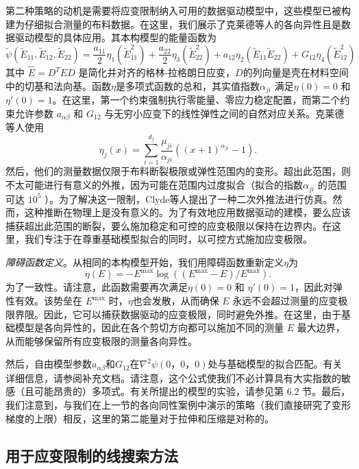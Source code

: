 第二种策略的动机是需要将应变限制纳入可用的数据驱动模型中，这些模型已被构建为仔细拟合测量的布料数据。在这里，我们展示了克莱德等人的各向异性且是数据驱动模型的具体应用。其本构模型的能量函数为
\begin{equation}
  \tilde\psi(\tilde E_{11},\tilde E_{12},\tilde E_{22}) = \frac{a_{11}}{2} \eta_1(\tilde E_{11}^2)+\frac{a_{22}}{2}\eta_3(\tilde E_{22}^2)
  + a_{12}\eta_2(\tilde E_{11}\tilde E_{22})+G_{12}\eta_4(\tilde E_{12}^2)
\end{equation}
其中 $\hat E = D^TED$ 是简化并对齐的格林-拉格朗日应变，$D$的列向量是壳在材料空间中的切基和法向基。函数$η$是多项式函数的总和，其实值指数$α _{j i}$ 满足$\eta(0) = 0$ 和 $\eta'(0) = 1$。在这里，第一个约束强制执行零能量、零应力稳定配置，而第二个约束允许参数 $a_{\alpha\beta}$ 和 $G _{12}$ 与无穷小应变下的线性弹性之间的自然对应关系。克莱德等人使用
\begin{equation}
  \eta_j(x) = \sum_{i = 1}^{d_j} \frac{\mu_{ji}}{\alpha_{ji}}((x+1)^{\alpha_{ji}} - 1).
\end{equation}
然后，他们的测量数据仅限于布料断裂极限或弹性范围内的变形。超出此范围，则不太可能进行有意义的外推，因为可能在范围内过度拟合（拟合的指数$α_{ji}$ 的范围可达 $10^5$ ）。为了解决这一限制，Clyde等人提出了一种二次外推法进行仿真。然而，这种推断在物理上是没有意义的。为了有效地应用数据驱动的建模，要么应该捕获超出此范围的断裂，要么施加稳定和可控的应变极限以保持在边界内。在这里，我们专注于在尊重基础模型拟合的同时，以可控方式施加应变极限。

\textit{障碍函数定义}。从相同的本构模型开始，我们用障碍函数重新定义$\eta$为
\begin{equation}
  \eta(E) = -E^{\max} \log ((E^{\max} - E) / E^{\max}).
\end{equation}
为了一致性。请注意，此函数需要再次满足$\eta(0) = 0$ 和 $\eta' (0)= 1$，因此对弹性有效。该势垒在 $E^{\max}$ 时，$\eta$也会发散，从而确保 $E$ 永远不会超过测量的应变极限界限。因此，它可以捕获数据驱动的应变极限，同时避免外推。在这里，由于基础模型是各向异性的，因此在各个剪切方向都可以施加不同的测量 $E$ 最大边界，从而能够保留所有应变极限的测量各向异性。

然后，自由模型参数$a_{\alpha\beta}$和$G_{12}$在$\nabla^2\psi(0，0，0)$处与基础模型的拟合匹配。有关详细信息，请参阅补充文档。请注意，这个公式使我们不必计算具有大实指数的敏感（且可能昂贵的）多项式。有关所提出的模型的实验，请参见第 6.2 节。最后，我们注意到，与我们在上一节的各向同性案例中演示的策略（我们直接研究了变形梯度的上限）相反，这里的第二能量对于拉伸和压缩是对称的。

\subsection{用于应变限制的线搜索方法}

